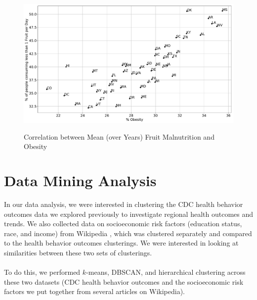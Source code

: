\documentclass{article}
\begin{document}
\begin{figure}[h]
\centering
\caption{Correlation between Mean (over Years) Fruit Malnutrition and Obesity}
\includegraphics[width=\linewidth]{images/exploration_fruit_malnutrition_vs_obesity.pdf}
\label{fig:fruitMalnutritionVsObesity}
\end{figure}

\section{Data Mining Analysis}
\label{dataanalysis}
In our data analysis, we were interested in clustering the CDC health behavior outcomes data we explored previously to investigate regional health outcomes and trends. We also collected data on socioeconomic risk factors (education status, race, and income) from Wikipedia \cite{demodata, eduratesdata, incomedata}, which was clustered separately and compared to the health behavior outcomes clusterings. 
We were interested in looking at similarities between these two sets of clusterings.
\\\\
To do this, we performed $k$-means, DBSCAN, and hierarchical clustering across these two datasets (CDC health behavior outcomes and the socioeconomic risk factors we put together from several articles on Wikipedia).
\end{document}
